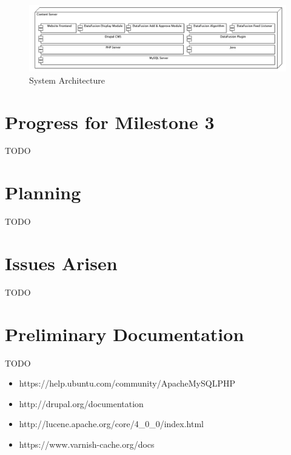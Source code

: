 \documentclass[12pt]{article} %
\begin{document}
\begin{figure}[htbp]
\begin{center}
\includegraphics[width=6in]{images/software_stack}
\caption{System Architecture}
\end{center}
\end{figure}

\section{Progress for Milestone 3}

TODO

\section{Planning}

TODO

\section{Issues Arisen}

TODO

\section{Preliminary Documentation}

TODO

\begin{itemize}
\item https://help.ubuntu.com/community/ApacheMySQLPHP
\item http://drupal.org/documentation
\item http://lucene.apache.org/core/4\_0\_0/index.html
\item https://www.varnish-cache.org/docs
\end{itemize}
\end{document}
